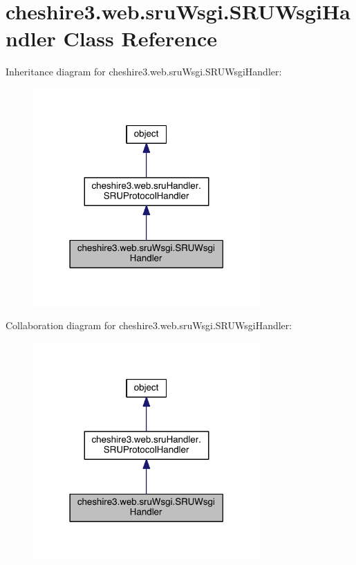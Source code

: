 \hypertarget{classcheshire3_1_1web_1_1sru_wsgi_1_1_s_r_u_wsgi_handler}{\section{cheshire3.\-web.\-sru\-Wsgi.\-S\-R\-U\-Wsgi\-Handler Class Reference}
\label{classcheshire3_1_1web_1_1sru_wsgi_1_1_s_r_u_wsgi_handler}
}


Inheritance diagram for cheshire3.\-web.\-sru\-Wsgi.\-S\-R\-U\-Wsgi\-Handler\-:
\nopagebreak
\begin{figure}[H]
\begin{center}
\leavevmode
\includegraphics[width=246pt]{classcheshire3_1_1web_1_1sru_wsgi_1_1_s_r_u_wsgi_handler__inherit__graph}
\end{center}
\end{figure}


Collaboration diagram for cheshire3.\-web.\-sru\-Wsgi.\-S\-R\-U\-Wsgi\-Handler\-:
\nopagebreak
\begin{figure}[H]
\begin{center}
\leavevmode
\includegraphics[width=246pt]{classcheshire3_1_1web_1_1sru_wsgi_1_1_s_r_u_wsgi_handler__coll__graph}
\end{center}
\end{figure}
